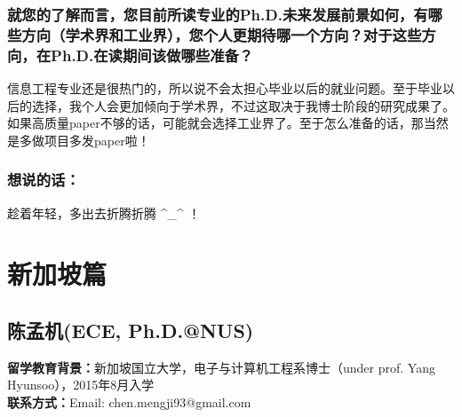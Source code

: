 \documentclass[a4paper,UTF8]{book}
\begin{document}
    \subsubsection*{就您的了解而言，您目前所读专业的Ph.D.未来发展前景如何，有哪些方向（学术界和工业界），您个人更期待哪一个方向？对于这些方向，在Ph.D.在读期间该做哪些准备？}
    信息工程专业还是很热门的，所以说不会太担心毕业以后的就业问题。至于毕业以后的选择，我个人会更加倾向于学术界，不过这取决于我博士阶段的研究成果了。如果高质量paper不够的话，可能就会选择工业界了。至于怎么准备的话，那当然是多做项目多发paper啦！
    
    \subsubsection{想说的话：}
    趁着年轻，多出去折腾折腾 \^{}\_\^{} ！

\clearpage
\section{新加坡篇}

\subsection{陈孟机(ECE, Ph.D.@NUS)}
    \textbf{留学教育背景：}新加坡国立大学，电子与计算机工程系博士（under prof. Yang Hyunsoo），2015年8月入学\\
    \textbf{联系方式：}Email: chen.mengji93@gmail.com
\end{document}
